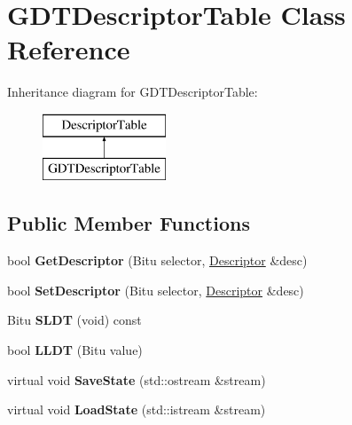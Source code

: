 \hypertarget{classGDTDescriptorTable}{\section{G\-D\-T\-Descriptor\-Table Class Reference}
\label{classGDTDescriptorTable}
}
Inheritance diagram for G\-D\-T\-Descriptor\-Table\-:\begin{figure}[H]
\begin{center}
\leavevmode
\includegraphics[height=2.000000cm]{classGDTDescriptorTable}
\end{center}
\end{figure}
\subsection*{Public Member Functions}
\begin{DoxyCompactItemize}
\item 
\hypertarget{classGDTDescriptorTable_ac76fa58e1a03cd52a1a8e180ac42c52a}{bool {\bfseries Get\-Descriptor} (Bitu selector, \hyperlink{classDescriptor}{Descriptor} \&desc)}\label{classGDTDescriptorTable_ac76fa58e1a03cd52a1a8e180ac42c52a}

\item 
\hypertarget{classGDTDescriptorTable_a6f67ad7a7d505aec8a23dc42bc078cbc}{bool {\bfseries Set\-Descriptor} (Bitu selector, \hyperlink{classDescriptor}{Descriptor} \&desc)}\label{classGDTDescriptorTable_a6f67ad7a7d505aec8a23dc42bc078cbc}

\item 
\hypertarget{classGDTDescriptorTable_ad4541f8edd71d3669157d54a75a4e01b}{Bitu {\bfseries S\-L\-D\-T} (void) const }\label{classGDTDescriptorTable_ad4541f8edd71d3669157d54a75a4e01b}

\item 
\hypertarget{classGDTDescriptorTable_aa6ef4a40eaec4d675ce8e4d06f26f0db}{bool {\bfseries L\-L\-D\-T} (Bitu value)}\label{classGDTDescriptorTable_aa6ef4a40eaec4d675ce8e4d06f26f0db}

\item 
\hypertarget{classGDTDescriptorTable_a247e1db5654d6165a8b2605ad87cb37d}{virtual void {\bfseries Save\-State} (std\-::ostream \&stream)}\label{classGDTDescriptorTable_a247e1db5654d6165a8b2605ad87cb37d}

\item 
\hypertarget{classGDTDescriptorTable_a9e1ead9fb8298200432e5f1fc1bb26d6}{virtual void {\bfseries Load\-State} (std\-::istream \&stream)}\label{classGDTDescriptorTable_a9e1ead9fb8298200432e5f1fc1bb26d6}

\end{DoxyCompactItemize}


